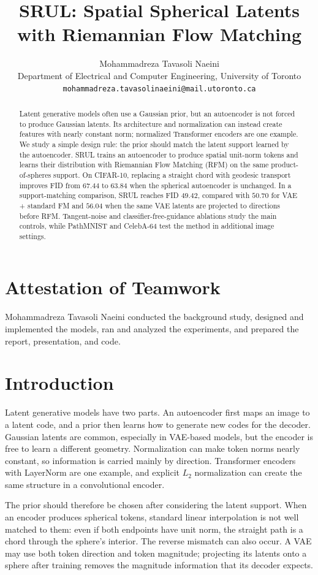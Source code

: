 \documentclass{article}
\title{SRUL: Spatial Spherical Latents with Riemannian Flow Matching}
\author{Mohammadreza Tavasoli Naeini \\
Department of Electrical and Computer Engineering, University of Toronto \\
\texttt{mohammadreza.tavasolinaeini@mail.utoronto.ca}}
\begin{document}
\maketitle

\begin{abstract}
Latent generative models often use a Gaussian prior, but an autoencoder is not forced to produce Gaussian latents. Its architecture and normalization can instead create features with nearly constant norm; normalized Transformer encoders are one example. We study a simple design rule: the prior should match the latent support learned by the autoencoder. SRUL trains an autoencoder to produce spatial unit-norm tokens and learns their distribution with Riemannian Flow Matching (RFM) on the same product-of-spheres support. On CIFAR-10, replacing a straight chord with geodesic transport improves FID from $67.44$ to $63.84$ when the spherical autoencoder is unchanged. In a support-matching comparison, SRUL reaches FID $49.42$, compared with $50.70$ for VAE + standard FM and $56.04$ when the same VAE latents are projected to directions before RFM. Tangent-noise and classifier-free-guidance ablations study the main controls, while PathMNIST and CelebA-64 test the method in additional image settings.
\end{abstract}

\section*{Attestation of Teamwork}
Mohammadreza Tavasoli Naeini conducted the background study, designed and implemented the models, ran and analyzed the experiments, and prepared the report, presentation, and code.

\section{Introduction}
Latent generative models have two parts. An autoencoder first maps an image to a latent code, and a prior then learns how to generate new codes for the decoder. Gaussian latents are common, especially in VAE-based models, but the encoder is free to learn a different geometry. Normalization can make token norms nearly constant, so information is carried mainly by direction. Transformer encoders with LayerNorm are one example, and explicit $L_2$ normalization can create the same structure in a convolutional encoder.

The prior should therefore be chosen after considering the latent support. When an encoder produces spherical tokens, standard linear interpolation is not well matched to them: even if both endpoints have unit norm, the straight path is a chord through the sphere's interior. The reverse mismatch can also occur. A VAE may use both token direction and token magnitude; projecting its latents onto a sphere after training removes the magnitude information that its decoder expects.
\end{document}
